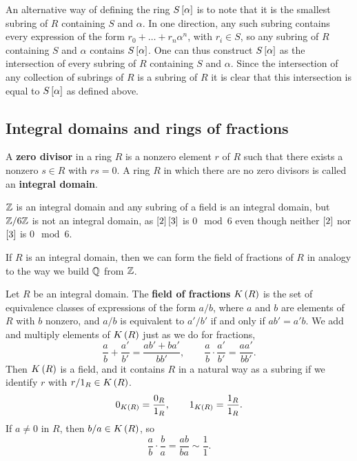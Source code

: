 An alternative way of defining the ring $ S\sbr{\alpha} $ is to note that it is the smallest subring of $ R $ containing $ S $ and $ \alpha $. In one direction, any such subring contains every expression of the form $ r_0 + \dots + r_n\alpha^n $, with $ r_i \in S $, so any subring of $ R $ containing $ S $ and $ \alpha $ contains $ S\sbr{\alpha} $. One can thus construct $ S\sbr{\alpha} $ as the intersection of every subring of $ R $ containing $ S $ and $ \alpha $. Since the intersection of any collection of subrings of $ R $ is a subring of $ R $ it is clear that this intersection is equal to $ S\sbr{\alpha} $ as defined above.

\pagebreak

\subsection{Integral domains and rings of fractions}


\begin{definition}
A \textbf{zero divisor} in a ring $ R $ is a nonzero element $ r $ of $ R $ such that there exists a nonzero $ s \in R $ with $ rs = 0 $. A ring $ R $ in which there are no zero divisors is called an \textbf{integral domain}.
\end{definition}

\begin{example*}
$ \mathbb{Z} $ is an integral domain and any subring of a field is an integral domain, but $ \mathbb{Z} / 6\mathbb{Z} $ is not an integral domain, as $ \sbr{2}\sbr{3} $ is $ 0 \mod 6 $ even though neither $ \sbr{2} $ nor $ \sbr{3} $ is $ 0 \mod 6 $.
\end{example*}

If $ R $ is an integral domain, then we can form the field of fractions of $ R $ in analogy to the way we build $ \mathbb{Q} $ from $ \mathbb{Z} $.

\begin{definition}
Let $ R $ be an integral domain. The \textbf{field of fractions} $ K\br{R} $ is the set of equivalence classes of expressions of the form $ a / b $, where $ a $ and $ b $ are elements of $ R $ with $ b $ nonzero, and $ a / b $ is equivalent to $ a' / b' $ if and only if $ ab' = a'b $. We add and multiply elements of $ K\br{R} $ just as we do for fractions,
$$ \dfrac{a}{b} + \dfrac{a'}{b'} = \dfrac{ab' + ba'}{bb'}, \qquad \dfrac{a}{b} \cdot \dfrac{a'}{b'} = \dfrac{aa'}{bb'}. $$
Then $ K\br{R} $ is a field, and it contains $ R $ in a natural way as a subring if we identify $ r $ with $ r / 1_R \in K\br{R} $.
$$ 0_{K\br{R}} = \dfrac{0_R}{1_R}, \qquad 1_{K\br{R}} = \dfrac{1_R}{1_R}. $$
If $ a \ne 0 $ in $ R $, then $ b / a \in K\br{R} $, so
$$ \dfrac{a}{b} \cdot \dfrac{b}{a} = \dfrac{ab}{ba} \sim \dfrac{1}{1}. $$
\end{definition}

